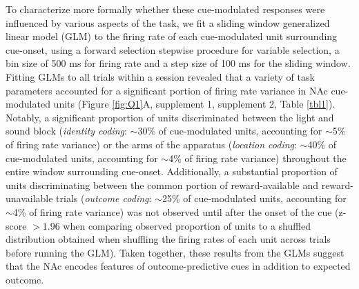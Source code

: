 \documentclass[11pt]{article}
\begin{document}
To characterize more formally whether these cue-modulated responses were influenced by various aspects of the task, we fit a sliding window generalized linear model (GLM) to the firing rate of each cue-modulated unit surrounding cue-onset, using a forward selection stepwise procedure for variable selection, a bin size of 500 ms for firing rate and a step size of 100 ms for the sliding window. Fitting GLMs to all trials within a session revealed that a variety of task parameters accounted for a significant portion of firing rate variance in NAc cue-modulated units (Figure \ref{fig:Q1}A, supplement 1, supplement 2, Table \ref{tbl1}). Notably, a significant proportion of units discriminated between the light and sound block ({\it identity coding}: $\sim$30\% of cue-modulated units, accounting for $\sim$5\% of firing rate variance) or the arms of the apparatus ({\it location coding}: $\sim$40\% of cue-modulated units, accounting for $\sim$4\% of firing rate variance) throughout the entire window surrounding cue-onset. Additionally, a substantial proportion of units discriminating between the common portion of reward-available and reward-unavailable trials ({\it outcome coding}: $\sim$25\% of cue-modulated units, accounting for $\sim$4\% of firing rate variance) was not observed until after the onset of the cue (z-score $>1.96$ when comparing observed proportion of units to a shuffled distribution obtained when shuffling the firing rates of each unit across trials before running the GLM). Taken together, these results from the GLMs suggest that the NAc encodes features of outcome-predictive cues in addition to expected outcome. 
\end{document}
